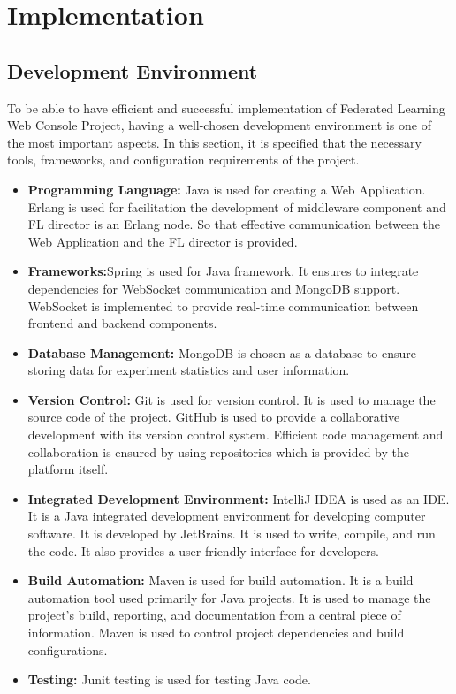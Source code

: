 \chapter{Implementation}

\section{Development Environment}

To be able to have efficient and successful implementation of Federated Learning Web Console Project, having a well-chosen development environment is one of the
most important aspects. In this section, it is specified that the necessary tools, frameworks, and configuration requirements of the project. \\
\begin{itemize}
    \item \textbf{Programming Language:} Java is used for creating a Web Application. Erlang is used for facilitation the development of middleware component and FL director is an Erlang node.
    So that effective communication between the Web Application and the FL director is provided.
    \item \textbf{Frameworks:}Spring is used for Java framework. It ensures to integrate dependencies for WebSocket communication and MongoDB support.
    WebSocket is implemented to provide real-time communication between frontend and backend components.
    \item \textbf{Database Management:} MongoDB is chosen as a database to ensure storing data for experiment statistics and user information.
    \item \textbf{Version Control:} Git is used for version control. It is used to manage the source code of the project. GitHub is used to provide a collaborative development with its version control system. Efficient code management and collaboration is ensured by using repositories which is provided by the platform itself.
    \item \textbf{Integrated Development Environment:} IntelliJ IDEA is used as an IDE. It is a Java integrated development environment for developing computer software. It is developed by JetBrains. It is used to write, compile, and run the code. It also provides a user-friendly interface for developers.
    \item \textbf{Build Automation:} Maven is used for build automation. It is a build automation tool used primarily for Java projects. It is used to manage the project's build, reporting, and documentation from a central piece of information. Maven is used to control project dependencies and build configurations.
    \item \textbf{Testing: } Junit testing is used for testing Java code.
\end{itemize}


